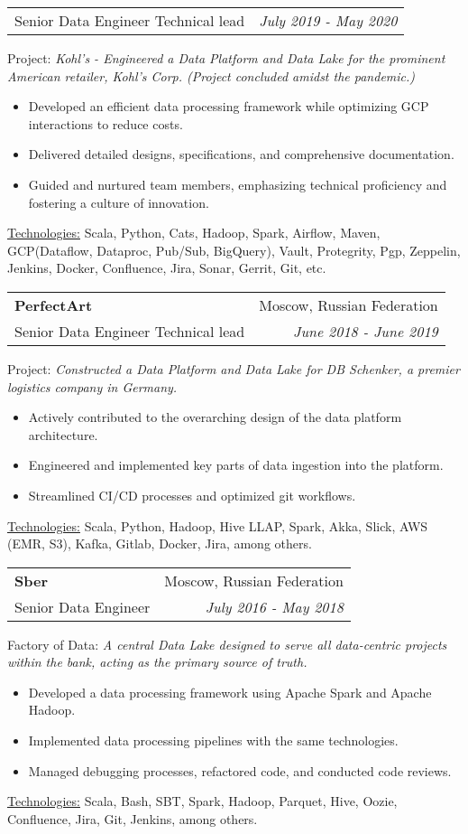 \documentclass[letterpaper,11pt]{article}
\makeatletter
\newcommand{\sepsection}{\vspace{25pt}}
\newcommand{\resumeItem}[1]{%
    \item\small{
        #1
    }
}
\newcommand{\resumeSubheading}[4]{
    \vspace{8pt}\item%
    \begin{tabular*}{0.97\textwidth}[t]{l@{\extracolsep{\fill}}r}
        \textbf{#1}     & #2                 \\
        \textnormal{#3} & \textit{\small #4} \\
    \end{tabular*}\vspace{-5pt}
}
\newcommand{\resumeSubSubheading}[2]{
    \vspace{5pt}
    \begin{tabular*}{0.97\textwidth}{l@{\extracolsep{\fill}}r}
        \textnormal{#1} & \textit{\small #2} \\
    \end{tabular*}\vspace{-5pt}
}
\newcommand{\resumeProjectDescription}[2]{\vspace{5pt} \textnormal{#1:} \textit{\small#2}}
\newcommand{\resumeItemListStart}{\begin{itemize}}
\newcommand{\resumeItemListEnd}{\end{itemize}\vspace{-5pt}}
\newcommand{\resumeTech}[2]{
\underline{#1:} #2
}
\makeatother
\begin{document}
\resumeSubSubheading
{Senior Data Engineer \textbar Technical lead}{July 2019 - May 2020}

\resumeProjectDescription{Project}{Kohl’s - Engineered a Data Platform and Data Lake for the prominent American retailer, Kohl's Corp. (Project concluded amidst the pandemic.)}

\resumeItemListStart
\resumeItem{Developed an efficient data processing framework while optimizing GCP interactions to reduce costs.}
\resumeItem{Delivered detailed designs, specifications, and comprehensive documentation.}
\resumeItem{Guided and nurtured team members, emphasizing technical proficiency and fostering a culture of innovation.}
\resumeItemListEnd
\resumeTech{Technologies}{Scala, Python, Cats, Hadoop, Spark, Airflow, Maven, GCP(Dataflow, Dataproc, Pub/Sub, BigQuery), Vault, Protegrity, Pgp, Zeppelin, Jenkins, Docker, Confluence, Jira, Sonar, Gerrit, Git, etc.}\\

\sepsection

\resumeSubheading
{PerfectArt \href{https://perfectart.ru/}{\color{urlcolor}\faicon{link}}}{Moscow, Russian Federation}
{Senior Data Engineer \textbar Technical lead}{June 2018 - June 2019}

\resumeProjectDescription{Project}{Constructed a Data Platform and Data Lake for DB Schenker, a premier logistics company in Germany.}

\resumeItemListStart
\resumeItem{Actively contributed to the overarching design of the data platform architecture.}
\resumeItem{Engineered and implemented key parts of data ingestion into the platform.}
\resumeItem{Streamlined CI/CD processes and optimized git workflows.}
\resumeItemListEnd
\resumeTech{Technologies}{Scala, Python, Hadoop, Hive LLAP, Spark, Akka, Slick, AWS (EMR, S3), Kafka, Gitlab, Docker, Jira, among others.}\\

\sepsection

\resumeSubheading
{Sber \href{https://www.sberbank.ru/}{\color{urlcolor}\faicon{link}}}{Moscow, Russian Federation}
{Senior Data Engineer}{July 2016 - May 2018}

\resumeProjectDescription{Factory of Data}{A central Data Lake designed to serve all data-centric projects within the bank, acting as the primary source of truth.}

\resumeItemListStart
\resumeItem{Developed a data processing framework using Apache Spark and Apache Hadoop.}
\resumeItem{Implemented data processing pipelines with the same technologies.}
\resumeItem{Managed debugging processes, refactored code, and conducted code reviews.}
\resumeItemListEnd
\resumeTech{Technologies}{Scala, Bash, SBT, Spark, Hadoop, Parquet, Hive, Oozie, Confluence, Jira, Git, Jenkins, among others.}\\
\end{document}
